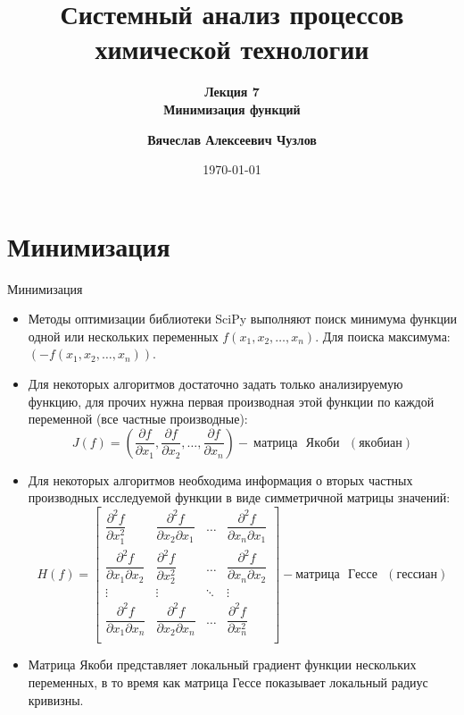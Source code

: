 \documentclass[aspectratio=169, mathserif]{beamer}	%
\title{\LARGE{Системный анализ процессов химической технологии}}
\subtitle{\textcolor{tpugreen}{\textbf{Лекция 7}} \\ \textbf{Минимизация функций}}
\author[]{\textbf{Вячеслав Алексеевич Чузлов}}
\institute{к.т.н., доцент ОХИ ИШПР}
\date{\today}
\begin{document}

\titleframe		%

\tocframe{}		%


\section{Минимизация}
\sectionframe

\begin{frame}[fragile]{Минимизация}
\scriptsize
\begin{itemize}
\item Методы оптимизации библиотеки SciPy выполняют поиск минимума функции одной или нескольких переменных $f(x_1, x_2, \dots, x_n)$. Для поиска максимума: $\left(-f(x_1, x_2, \dots, x_n)\right)$.

\item Для некоторых алгоритмов достаточно задать только анализируемую функцию, для прочих нужна первая производная этой функции по каждой переменной (все частные производные):
\vfill
\begin{equation}
	J(f) = \left(\dfrac{\partial f}{\partial x_1}, \dfrac{\partial f}{\partial x_2}, \dots, \dfrac{\partial f}{\partial x_n}\right) - \mathrm{~матрица \text{ } Якоби \text{ } (якобиан)}
\end{equation}
\vfill
\item Для некоторых алгоритмов необходима информация о вторых частных производных исследуемой функции в виде симметричной матрицы значений:
\vfill
\begin{equation}
H(f) =
\begin{bmatrix}
	 \dfrac{\partial^2 f}{\partial x^2_1} & \dfrac{\partial^2 f}{\partial x_2 \partial x_1}
	 & \dots & \dfrac{\partial^2 f}{\partial x_n \partial x_1} \\

	 \dfrac{\partial^2 f}{\partial x_1 \partial x_2} & \dfrac{\partial^2 f}{\partial x^2_2}
	 & \dots & \dfrac{\partial^2 f}{\partial x_n \partial x_2} \\

	 \vdots & \vdots & \ddots & \vdots \\

	 \dfrac{\partial^2 f}{\partial x_1 \partial x_n} & \dfrac{\partial^2 f}{\partial x_2 \partial x_n}
	 & \dots & \dfrac{\partial^2 f}{\partial x^2_n} \\
\end{bmatrix} - \mathrm{матрица \text{ } Гессе \text{ } (гессиан)}
\end{equation}
\vfill
\item Матрица Якоби представляет локальный градиент функции нескольких переменных, в то время как матрица Гессе показывает локальный радиус кривизны.
\end{itemize}
\vfill
\end{frame}
\end{document}
